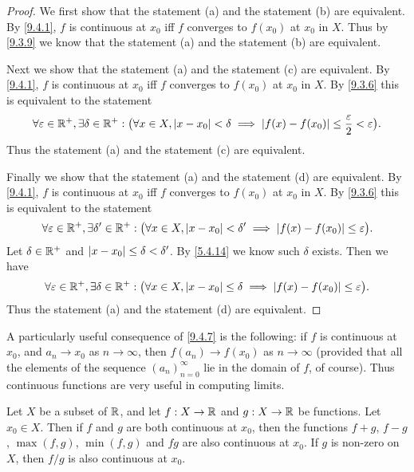 \begin{proof}
  We first show that the statement (a) and the statement (b) are equivalent.
  By \cref{9.4.1}, \(f\) is continuous at \(x_0\) iff \(f\) converges to \(f(x_0)\) at \(x_0\) in \(X\).
  Thus by \cref{9.3.9} we know that the statement (a) and the statement (b) are equivalent.

  Next we show that the statement (a) and the statement (c) are equivalent.
  By \cref{9.4.1}, \(f\) is continuous at \(x_0\) iff \(f\) converges to \(f(x_0)\) at \(x_0\) in \(X\).
  By \cref{9.3.6} this is equivalent to the statement
  \[
    \forall \varepsilon \in \mathbb{R}^+, \exists \delta \in \mathbb{R}^+ : \big(\forall x \in X, \left\lvert x - x_0\right\rvert < \delta \implies \left\lvert f(x) - f(x_0)\right\rvert \leq \dfrac{\varepsilon}{2} < \varepsilon\big).
  \]
  Thus the statement (a) and the statement (c) are equivalent.

  Finally we show that the statement (a) and the statement (d) are equivalent.
  By \cref{9.4.1}, \(f\) is continuous at \(x_0\) iff \(f\) converges to \(f(x_0)\) at \(x_0\) in \(X\).
  By \cref{9.3.6} this is equivalent to the statement
  \[
    \forall \varepsilon \in \mathbb{R}^+, \exists \delta' \in \mathbb{R}^+ : \big(\forall x \in X, \left\lvert x - x_0\right\rvert < \delta' \implies \left\lvert f(x) - f(x_0)\right\rvert \leq \varepsilon\big).
  \]
  Let \(\delta \in \mathbb{R}^+\) and \(\left\lvert x - x_0\right\rvert \leq \delta < \delta'\).
  By \cref{5.4.14} we know such \(\delta\) exists.
  Then we have
  \[
    \forall \varepsilon \in \mathbb{R}^+, \exists \delta \in \mathbb{R}^+ : \big(\forall x \in X, \left\lvert x - x_0\right\rvert \leq \delta \implies \left\lvert f(x) - f(x_0)\right\rvert \leq \varepsilon\big).
  \]
  Thus the statement (a) and the statement (d) are equivalent.
\end{proof}

\begin{rmk}\label{9.4.8}
  A particularly useful consequence of \cref{9.4.7} is the following:
  if \(f\) is continuous at \(x_0\), and \(a_n \to x_0\) as \(n \to \infty\), then \(f(a_n) \to f(x_0)\) as \(n \to \infty\)
  (provided that all the elements of the sequence \((a_n)_{n = 0}^\infty\) lie in the domain of \(f\), of course).
  Thus continuous functions are very useful in computing limits.
\end{rmk}

\begin{prop}\label{9.4.9}
  Let \(X\) be a subset of \(\mathbb{R}\), and let \(f : X \to \mathbb{R}\) and \(g : X \to \mathbb{R}\) be functions.
  Let \(x_0 \in X\).
  Then if \(f\) and \(g\) are both continuous at \(x_0\), then the functions \(f + g\), \(f - g\), \(\max(f, g)\), \(\min(f, g)\) and \(fg\) are also continuous at \(x_0\).
  If \(g\) is non-zero on \(X\), then \(f / g\) is also continuous at \(x_0\).
\end{prop}

